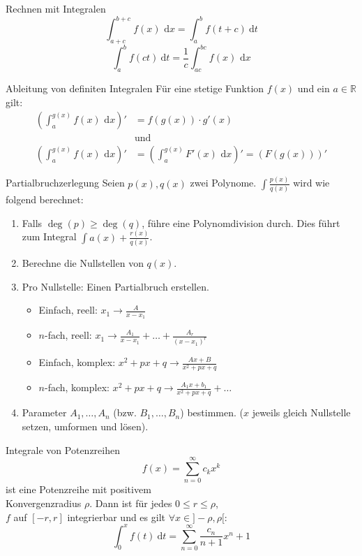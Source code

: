 \documentclass[a4paper,10pt]{article}
\def\dx{\text{ d}x}
\begin{document}
\begin{subbox}{Rechnen mit Integralen}
	$$\int_{a+c}^{b+c}f(x)\dx= \int_{a}^{b}f(t+c)\ \text{d}t $$	$$\int_{a}^{b}f(ct)\ \text{d}t= \frac{1}{c}\int_{ac}^{bc}f(x)\dx $$
\end{subbox}
\begin{subbox}{Ableitung von definiten Integralen}
	Für eine stetige Funktion $f(x)$ und ein $a \in \mathbb{R}$ gilt:
	$$
	\begin{aligned*}
		\left(\int_{a}^{g(x)}f(x) \dx \right)' & =f(g(x))\cdot g'(x)                                 \\
		                                       & \text{und}                                          \\
		\left(\int_{a}^{g(x)}f(x) \dx \right)' & =\left(\int_{a}^{g(x)}F'(x) \dx \right)'=(F(g(x)))' 
	\end{aligned*}
	$$
\end{subbox}

\begin{mainbox}{Partialbruchzerlegung}
	Seien $p(x), q(x)$ zwei Polynome. $\int \frac{p(x)}{q(x)}$ wird wie folgend berechnet:
	\begin{enumerate}
		\item Falls $\deg(p) \ge \deg(q)$, führe eine Polynomdivision durch. Dies führt zum Integral $\int a(x) + \frac{r(x)}{q(x)}$.
		\item Berechne die Nullstellen von $q(x)$.
		\item Pro Nullstelle: Einen Partialbruch erstellen.
		      \begin{itemize}
		      	\item Einfach, reell: $x_1 \to \frac{A}{x - x_1}$
		      	\item $n$-fach, reell: $x_1 \to \frac{A_1}{x - x_1} + \ldots + \frac{A_r}{(x-x_1)^r}$ 
		      	\item Einfach, komplex: $x^2 + px + q \to \frac{Ax + B} {x^2 + px + q}$
		      	\item $n$-fach, komplex: $x^2 + px + q \to \frac{A_1x+b_1}{x^2+px+q} + \ldots$
		      \end{itemize}
		\item Parameter $A_1, \ldots, A_n$ (bzw. $B_1, \ldots, B_n$) bestimmen. ($x$ jeweils gleich Nullstelle setzen, umformen und lösen).
		      
	\end{enumerate}
\end{mainbox}

\begin{mainbox}{Integrale von Potenzreihen}
	$$f(x)=\sum_{n=0}^\infty c_k x^k$$
	ist eine Potenzreihe mit positivem \\Konvergenzradius $\rho$. Dann ist für jedes $0\leq r \leq \rho$, \\$f$ auf $[-r,r]$ integrierbar und es gilt $\forall x\in ]-\rho, \rho[$:
	$$\int_0^x f(t)\ \text{d}t=\sum_{n=0}^\infty \frac{c_n}{n+1} x^n+1$$
\end{mainbox}
\end{document}

